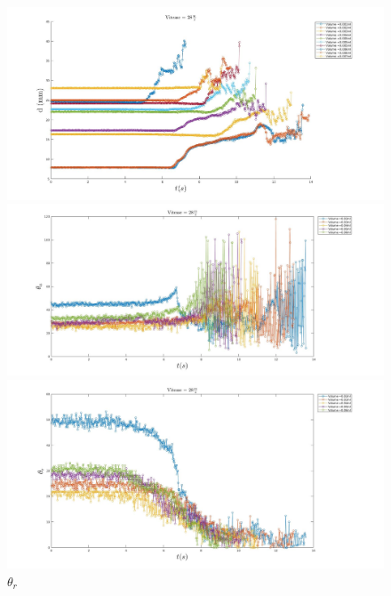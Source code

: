 \documentclass[french]{article}
\begin{document}
\begin{figure}[!h]
	\begin{minipage}{0.95\linewidth}
	\includegraphics[width = \linewidth]{./image/v=28d.jpg}
	\caption{$d$}
	\end{minipage}
	\begin{minipage}{0.95\linewidth}
	\includegraphics[width = \linewidth]{./image/v=28oa_2.jpg}
	\caption{$\theta_{a}$}
	\end{minipage}
	\begin{minipage}{0.95\linewidth}
	\includegraphics[width = \linewidth]{./image/v=28or_2.jpg}
	\caption{$\theta_{r}$}
	\end{minipage}
\end{figure}
\end{document}
